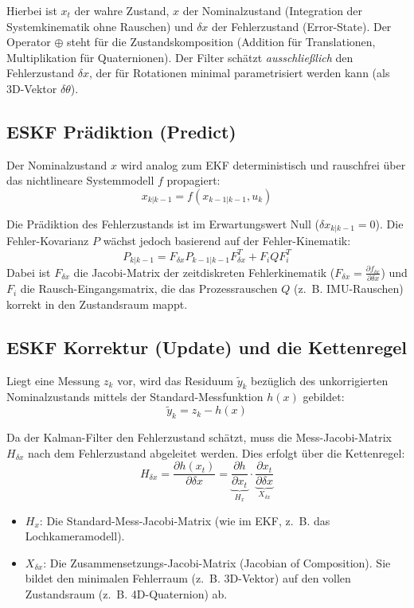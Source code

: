 \documentclass{article}
\begin{document}
Hierbei ist $x_t$ der wahre Zustand, $x$ der Nominalzustand (Integration der Systemkinematik ohne Rauschen) und $\delta x$ der Fehlerzustand (Error-State). Der Operator $\oplus$ steht für die Zustandskomposition (Addition für Translationen, Multiplikation für Quaternionen). Der Filter schätzt \textit{ausschließlich} den Fehlerzustand $\delta x$, der für Rotationen minimal parametrisiert werden kann (als 3D-Vektor $\delta \theta$).




\subsection{ESKF Prädiktion (Predict)}
Der Nominalzustand $x$ wird analog zum EKF deterministisch und rauschfrei über das nichtlineare Systemmodell $f$ propagiert:
\begin{equation}
    x_{k|k-1} = f(x_{k-1|k-1}, u_k)
\end{equation}

Die Prädiktion des Fehlerzustands ist im Erwartungswert Null ($\delta x_{k|k-1} = 0$). Die Fehler-Kovarianz $P$ wächst jedoch basierend auf der Fehler-Kinematik:
\begin{equation}
    P_{k|k-1} = F_{\delta x} P_{k-1|k-1} F_{\delta x}^T + F_i Q F_i^T
\end{equation}
Dabei ist $F_{\delta x}$ die Jacobi-Matrix der zeitdiskreten Fehlerkinematik ($F_{\delta x} = \frac{\partial f_{\delta x}}{\partial \delta x}$) und $F_i$ die Rausch-Eingangsmatrix, die das Prozessrauschen $Q$ (z.~B. IMU-Rauschen) korrekt in den Zustandsraum mappt.




\subsection{ESKF Korrektur (Update) und die Kettenregel}
Liegt eine Messung $z_k$ vor, wird das Residuum $\tilde{y}_k$ bezüglich des unkorrigierten Nominalzustands mittels der Standard-Messfunktion $h(x)$ gebildet:
\begin{equation}
    \tilde{y}_k = z_k - h(x)
\end{equation}

Da der Kalman-Filter den Fehlerzustand schätzt, muss die Mess-Jacobi-Matrix $H_{\delta x}$ nach dem Fehlerzustand abgeleitet werden. Dies erfolgt über die Kettenregel:
\begin{equation}
    H_{\delta x} = \frac{\partial h(x_t)}{\partial \delta x} = \underbrace{\frac{\partial h}{\partial x_t}}_{H_x} \cdot \underbrace{\frac{\partial x_t}{\partial \delta x}}_{X_{\delta x}}
\end{equation}
\begin{itemize}
    \item $H_x$: Die Standard-Mess-Jacobi-Matrix (wie im EKF, z.~B. das Lochkameramodell).
    \item $X_{\delta x}$: Die Zusammensetzungs-Jacobi-Matrix (Jacobian of Composition). Sie bildet den minimalen Fehlerraum (z.~B. 3D-Vektor) auf den vollen Zustandsraum (z.~B. 4D-Quaternion) ab.
\end{itemize}
\end{document}
